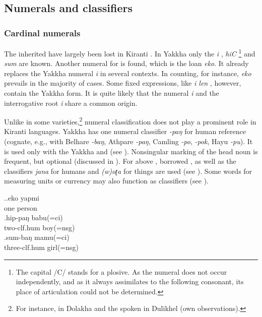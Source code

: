 \subsection{Numerals and classifiers}\label{sec-num}

\subsubsection{Cardinal numerals}

The inherited   have largely been lost in Kiranti \citep{Ebert1994The-structure}. In Yakkha only the  \emph{i} , \emph{hiC} \footnote{The capital /C/ stands for a plosive. As the numeral does not occur independently, and as it always assimilates to the following consonant, its place of articulation could not be determined.} and \emph{sum}  are known. Another  numeral for  is found, which is the  loan \emph{eko}. It already replaces the Yakkha numeral \emph{i} in several contexts. In counting, for instance,  \emph{eko} prevails in the majority of cases. Some fixed expressions, like \emph{i len} , however, contain the Yakkha form.
\largerpage
 It is quite likely  that the numeral \emph{i} and the interrogative root \emph{i} share a common origin.

Unlike in some  varieties,\footnote{For instance, in Dolakha  \citep[220]{Genetti2007_Newari} and the  spoken in Dulikhel (own observations).} numeral classification does not play a prominent role in Kiranti languages. Yakkha has one numeral classifier \emph{-paŋ} for human reference (cognate, e.g., with Belhare \emph{-baŋ}, Athpare \emph{-paŋ}, Camling \emph{-po},  \emph{-pok}, Hayu \emph{-pu}). It is  used only with the Yakkha   and   (see \Next).  Nonsingular marking of the head noun is frequent, but optional (discussed in  ). For  above ,  borrowed  , as well as the  classifiers \emph{jana} for humans and \emph{(w)oʈa} for things are used (see \NNext[a]). Some words for measuring units or currency may also function as classifiers (see \NNext[b]).  

\ex.\ag.eko yapmi\\
one person\\
\bg.hip-paŋ babu(=ci)\\
two{\sc -clf.hum} boy({\sc =nsg})\\
\bg.sum-baŋ mamu(=ci)\\
three{\sc -clf.hum} girl({\sc =nsg})\\

